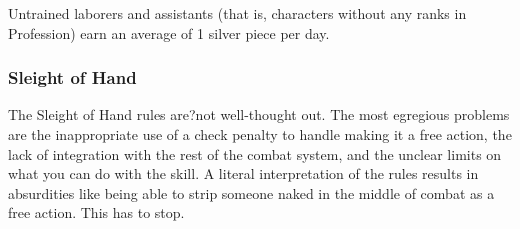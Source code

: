 Untrained laborers and assistants (that is, characters without any ranks in Profession) earn an average of 1 silver piece per day.

\subsubsection{Sleight of Hand}

The Sleight of Hand rules are?not well-thought out. The most egregious problems are the inappropriate use of a check penalty to handle making it a free action, the lack of integration with the rest of the combat system, and the unclear limits on what you can do with the skill. A literal interpretation of the rules results in absurdities like being able to strip someone naked in the middle of combat as a free action. This has to stop.

